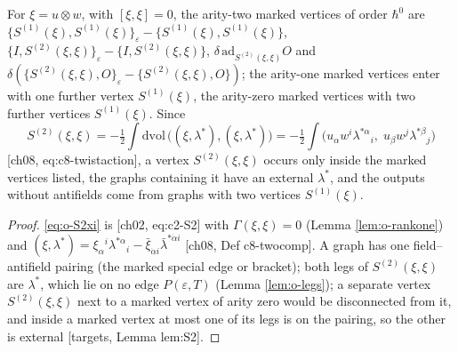 \begin{proposition}
\label{prop:o-arity2}
For $\xi=u\otimes w$, with $[\xi,\xi]=0$, the arity-two marked vertices of order $\hbar^0$ are $\{S^{(1)}(\xi),S^{(1)}(\xi)\}_\varepsilon-\{S^{(1)}(\xi),S^{(1)}(\xi)\}$, $\{I,S^{(2)}(\xi,\xi)\}_\varepsilon-\{I,S^{(2)}(\xi,\xi)\}$, $\delta\,\mathrm{ad}_{S^{(2)}(\xi,\xi)}O$ and $\delta(\{S^{(2)}(\xi,\xi),O\}_\varepsilon-\{S^{(2)}(\xi,\xi),O\})$; the arity-one marked vertices enter with one further vertex $S^{(1)}(\xi)$, the arity-zero marked vertices with two further vertices $S^{(1)}(\xi)$. Since
\begin{equation}
S^{(2)}(\xi,\xi)=-\tfrac12\int\mathrm{dvol}\,\big((\xi,\lambda^*),(\xi,\lambda^*)\big)=-\tfrac12\int\big(u_\alpha w^i\lambda^{*\alpha}{}_i,\;u_\beta w^j\lambda^{*\beta}{}_j\big)
\label{eq:o-S2xi}
\end{equation}
[ch08, eq:c8-twistaction], a vertex $S^{(2)}(\xi,\xi)$ occurs only inside the marked vertices listed, the graphs containing it have an external $\lambda^*$, and the outputs without antifields come from graphs with two vertices $S^{(1)}(\xi)$.
\end{proposition}

\begin{proof}
\eqref{eq:o-S2xi} is [ch02, eq:c2-S2] with $\Gamma(\xi,\xi)=0$ (Lemma \ref{lem:o-rankone}) and $(\xi,\lambda^*)=\xi_\alpha{}^i\lambda^{*\alpha}{}_i-\bar\xi_{\dot\alpha i}\bar\lambda^{*\dot\alpha i}$ [ch08, Def c8-twocomp]. A graph has one field--antifield pairing (the marked special edge or bracket); both legs of $S^{(2)}(\xi,\xi)$ are $\lambda^*$, which lie on no edge $P(\varepsilon,T)$ (Lemma \ref{lem:o-legs}); a separate vertex $S^{(2)}(\xi,\xi)$ next to a marked vertex of arity zero would be disconnected from it, and inside a marked vertex at most one of its legs is on the pairing, so the other is external [targets, Lemma lem:S2].
\end{proof}


